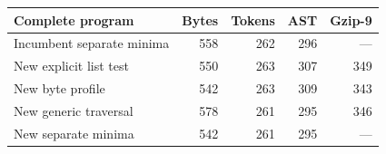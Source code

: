 \begin{center}\small
\begin{tabular}{lrrrr}
\toprule
Complete program & Bytes & Tokens & AST & Gzip-9\\
\midrule
Incumbent separate minima &558&262&296&---\\
New explicit list test &550&263&307&349\\
New byte profile &542&263&309&343\\
New generic traversal &578&261&295&346\\
\midrule
New separate minima &542&261&295&---\\
\bottomrule
\end{tabular}
\end{center}
